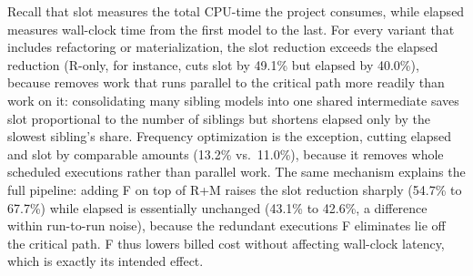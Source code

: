 
  Recall that slot measures the total CPU-time the project consumes, while elapsed measures wall-clock time from the first model to the last. For every variant that includes refactoring or materialization, the slot reduction exceeds the elapsed reduction (R-only, for instance, cuts slot by 49.1\% but elapsed by 40.0\%), because \dagsmith{} removes work that runs parallel to the critical path more readily than work on it: consolidating many sibling models into one shared intermediate saves slot proportional to the number of siblings but shortens elapsed only by the slowest sibling's share. Frequency optimization is the exception, cutting elapsed and slot by comparable amounts (13.2\% vs.\ 11.0\%), because it removes whole scheduled executions rather than parallel work. The same mechanism explains the full pipeline: adding F on top of R+M raises the slot reduction sharply (54.7\% to 67.7\%) while elapsed is essentially unchanged (43.1\% to 42.6\%, a difference within run-to-run noise), because the redundant executions F eliminates lie off the critical path. F thus lowers billed cost without affecting wall-clock latency, which is exactly its intended effect.




